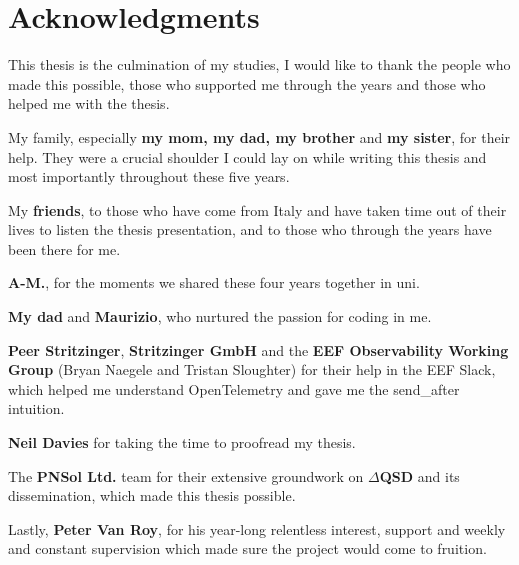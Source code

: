 \chapter*{Acknowledgments}
    This thesis is the culmination of my studies, I would like to thank the people who made this possible, those who supported me through the years and those who helped me with the thesis.
    
    \forceindent My family, especially \textbf{my mom, my dad, my brother} and \textbf{my sister}, for their help. They were a crucial shoulder I could lay on while writing this thesis and most importantly throughout these five years.
    
    \forceindent My \textbf{friends}, to those who have come from Italy and have taken time out of their lives to listen the thesis presentation, and to those who through the years have been there for me. 

    \forceindent \textbf{A-M.}, for the moments we shared these four years together in uni.

    \forceindent \textbf{My dad} and \textbf{Maurizio}, who nurtured the passion for coding in me.
    
    \forceindent \textbf{Peer Stritzinger}, \textbf{Stritzinger GmbH} and the \textbf{EEF Observability Working Group} (Bryan Naegele and Tristan Sloughter) for their help in the EEF Slack, which helped me understand OpenTelemetry and gave me the send\_after intuition.

    \forceindent \textbf{Neil Davies} for taking the time to proofread my thesis.

    \forceindent The \textbf{PNSol Ltd.} team for their extensive groundwork on \textbf{$\Delta$QSD} and its dissemination, which made this thesis possible.

    \forceindent Lastly, \textbf{Peter Van Roy}, for his year-long relentless interest, support and weekly and constant supervision which made sure the project would come to fruition. 


